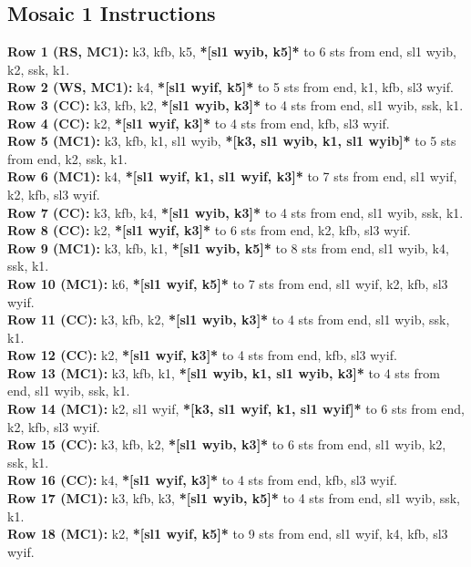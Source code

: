 \documentclass[12pt]{article}
\newcommand{\rowDir}[1]{\textbf{#1:}} %
\renewcommand{\repeat}[1]{\textbf{*[#1]*}} %
\begin{document}
\subsection*{Mosaic 1 Instructions}

\rowDir{Row 1 (RS, MC1)} k3, kfb, k5, \repeat{sl1 wyib, k5} to 6 sts from end, sl1 wyib, k2, ssk, k1. \\
\rowDir{Row 2 (WS, MC1)} k4, \repeat{sl1 wyif, k5} to 5 sts from end, k1, kfb, sl3 wyif. \\
\rowDir{Row 3 (CC)} k3, kfb, k2, \repeat{sl1 wyib, k3} to 4 sts from end, sl1 wyib, ssk, k1. \\
\rowDir{Row 4 (CC)} k2, \repeat{sl1 wyif, k3} to 4 sts from end, kfb, sl3 wyif. \\
\rowDir{Row 5 (MC1)} k3, kfb, k1, sl1 wyib, \repeat{k3, sl1 wyib, k1, sl1 wyib} to 5 sts from end, k2, ssk, k1. \\
\rowDir{Row 6 (MC1)} k4, \repeat{sl1 wyif, k1, sl1 wyif, k3} to 7 sts from end, sl1 wyif, k2, kfb, sl3 wyif. \\
\rowDir{Row 7 (CC)} k3, kfb, k4, \repeat{sl1 wyib, k3} to 4 sts from end, sl1 wyib, ssk, k1. \\
\rowDir{Row 8 (CC)} k2, \repeat{sl1 wyif, k3} to 6 sts from end, k2, kfb, sl3 wyif. \\
\rowDir{Row 9 (MC1)} k3, kfb, k1, \repeat{sl1 wyib, k5} to 8 sts from end, sl1 wyib, k4, ssk, k1. \\
\rowDir{Row 10 (MC1)} k6, \repeat{sl1 wyif, k5} to 7 sts from end, sl1 wyif, k2, kfb, sl3 wyif. \\
\rowDir{Row 11 (CC)} k3, kfb, k2, \repeat{sl1 wyib, k3} to 4 sts from end, sl1 wyib, ssk, k1. \\
\rowDir{Row 12 (CC)} k2, \repeat{sl1 wyif, k3} to 4 sts from end, kfb, sl3 wyif. \\
\rowDir{Row 13 (MC1)} k3, kfb, k1, \repeat{sl1 wyib, k1, sl1 wyib, k3} to 4 sts from end, sl1 wyib, ssk, k1. \\
\rowDir{Row 14 (MC1)} k2, sl1 wyif, \repeat{k3, sl1 wyif, k1, sl1 wyif} to 6 sts from end, k2, kfb, sl3 wyif. \\
\rowDir{Row 15 (CC)} k3, kfb, k2, \repeat{sl1 wyib, k3} to 6 sts from end, sl1 wyib, k2, ssk, k1. \\
\rowDir{Row 16 (CC)} k4, \repeat{sl1 wyif, k3} to 4 sts from end, kfb, sl3 wyif. \\
\rowDir{Row 17 (MC1)} k3, kfb, k3, \repeat{sl1 wyib, k5} to 4 sts from end, sl1 wyib, ssk, k1. \\
\rowDir{Row 18 (MC1)} k2, \repeat{sl1 wyif, k5} to 9 sts from end, sl1 wyif, k4, kfb, sl3 wyif. \\
\end{document}
